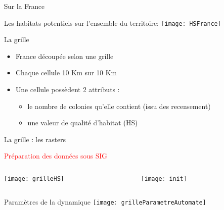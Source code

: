 \documentclass[]{beamer}
\begin{document}
\begin{frame}{Sur la France}
  \begin{center}
    Les habitats potentiels sur l’ensemble du territoire:
    \vspace{10pt}
    \texttt{[image: HSFrance]}
  \end{center}
\end{frame}



\begin{frame}{La grille}
  \begin{itemize}
  \item France découpée selon une grille  
  \item Chaque cellule 10 Km sur 10 Km
  \item Une cellule possèdent 2 attributs : 
    \begin{itemize}
    \item le nombre de colonies qu’elle contient (issu des recensement)
    \item une valeur de qualité d’habitat (HS)
    \end{itemize}
  \end{itemize}
\end{frame}

\begin{frame}{La grille : les rasters}
  \begin{center}
    \textcolor{red}{Préparation des données sous SIG}\\
  \end{center}
  \begin{columns}
    \begin{column}[c]{0.5\textwidth}
      \begin{center}
        \texttt{[image: grilleHS]}
      \end{center}
    \end{column}
    \begin{column}[c]{0.5\textwidth}
      \begin{center}

        \texttt{[image: init]}
      \end{center}
    \end{column}
  \end{columns}

\end{frame}

\begin{frame}{Paramètres de la dynamique}
  \texttt{[image: grilleParametreAutomate]}
\end{frame}
\end{document}
